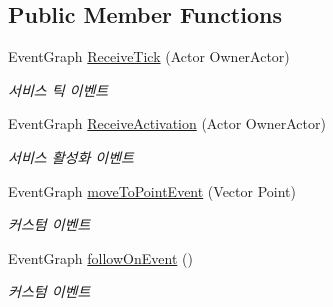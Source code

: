 \subsection*{Public Member Functions}
\begin{DoxyCompactItemize}
\item 
Event\+Graph \hyperlink{class_service___destination_a8c437b3d32d5112db9fc3bb7ea5c4ab7}{Receive\+Tick} (Actor Owner\+Actor)
\begin{DoxyCompactList}\small\item\em 서비스 틱 이벤트 \end{DoxyCompactList}\item 
Event\+Graph \hyperlink{class_service___destination_af36502a82e0508ac5756e5554949c3f4}{Receive\+Activation} (Actor Owner\+Actor)
\begin{DoxyCompactList}\small\item\em 서비스 활성화 이벤트 \end{DoxyCompactList}\item 
Event\+Graph \hyperlink{class_service___destination_a7169d7b9c59b120f637504d80abc20a3}{move\+To\+Point\+Event} (Vector Point)
\begin{DoxyCompactList}\small\item\em 커스텀 이벤트 \end{DoxyCompactList}\item 
Event\+Graph \hyperlink{class_service___destination_a888c766a24eb777337674cd67fd2ae21}{follow\+On\+Event} ()
\begin{DoxyCompactList}\small\item\em 커스텀 이벤트 \end{DoxyCompactList}\end{DoxyCompactItemize}
